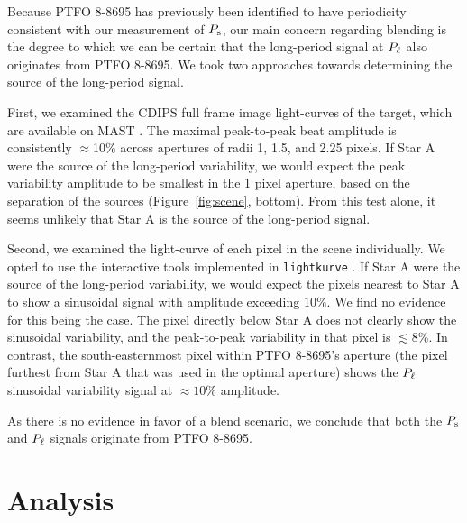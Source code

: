 \documentclass[12pt,twocolumn,tighten]{aastex62}
\begin{document}
Because PTFO 8-8695 has previously been identified to have periodicity
consistent with our measurement of $P_{\rm s}$, our main concern
regarding blending is the degree to which we can be certain that the
long-period signal at $P_{\rm \ell}$ also originates from PTFO 8-8695.
We took two approaches towards determining the source of the long-period signal.

First, we examined the CDIPS full frame image light-curves of the
target, which are available on MAST \citep{bouma_cluster_2019}.
The maximal peak-to-peak beat amplitude is consistently $\approx$10\%
across apertures of radii 1, 1.5, and 2.25 pixels.
If Star A were the source of the long-period variability, we would expect the
peak variability amplitude to be smallest in the 1 pixel aperture, based on the
separation of the sources (Figure~\ref{fig:scene}, bottom).
From this test alone, it seems unlikely that Star A is the source of
the long-period signal.

Second, we examined the light-curve of each pixel in the scene
individually.  We opted to use the
interactive tools implemented in
\texttt{lightkurve} \citep{lightkurve_2018}.  If Star A were the
source of the long-period variability, we would expect the pixels
nearest to Star A to show a sinusoidal signal with
amplitude exceeding $10\%$.  We find no evidence for
this being the case.  The pixel directly below Star A does not
clearly show the sinusoidal variability, and the peak-to-peak 
variability in that pixel is $\lesssim 8\%$.  In contrast, the
south-easternmost pixel within PTFO 8-8695's aperture (the pixel 
furthest from Star A that was used in the optimal aperture) shows the $P_{\rm \ell}$ sinusoidal
variability signal at $\approx 10\%$ amplitude.

As there is no evidence in favor of a blend scenario, we
conclude that both the $P_{\rm s}$ and $P_{\rm \ell}$ signals originate from PTFO 8-8695.


\section{Analysis}
\label{sec:analysis}

\end{document}
